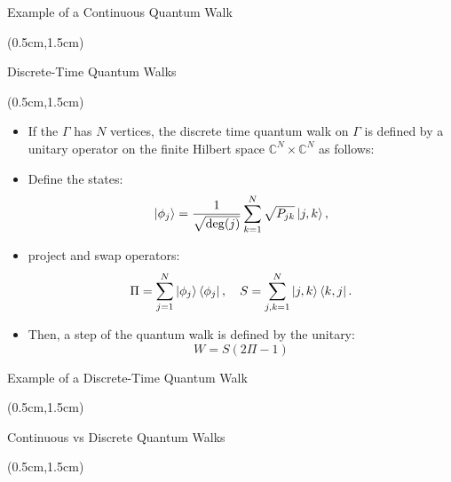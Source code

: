 \documentclass{beamer}
\theoremstyle{definition}
\begin{document}
\begin{frame}{Example of a Continuous Quantum Walk}
    
    \begin{textblock*}{12cm}(0.5cm,1.5cm)

                   
    \end{textblock*}
\end{frame}





\begin{frame}{Discrete-Time Quantum Walks}
    \begin{textblock*}{12cm}(0.5cm,1.5cm)
        \begin{itemize}
           
            
            \item If the $\Gamma$ has $N$ vertices, the discrete time quantum walk on $\Gamma$ is defined by a unitary operator on the finite Hilbert space $\mathbb{C}^N \times \mathbb{C}^N$ as follows:
            \item Define the states:
            \[ \ket{\phi_j} = \frac{1}{\sqrt{\deg(j)}} \sum_{k = 1}^N \sqrt{P_{jk}}\ket{j, k}, \]
            \item project and swap operators:
            \[ \Pi = \sum_{j = 1}^N \ket{\phi_j} \bra{\phi_j}, \quad S = \sum_{j, k = 1}^N \ket{j, k} \bra{k, j}. \]
            \item Then, a step of the quantum walk is defined by the unitary:
             \[
             W = S(2\Pi - 1)
             \]

        \end{itemize}
    \end{textblock*}
\end{frame}




\begin{frame}{Example of a Discrete-Time Quantum Walk}
    
    \begin{textblock*}{12cm}(0.5cm,1.5cm)

                   
    \end{textblock*}
\end{frame}






\begin{frame}{Continuous vs Discrete Quantum Walks }
    
    \begin{textblock*}{12cm}(0.5cm,1.5cm)

                   
    \end{textblock*}
\end{frame}
\end{document}
